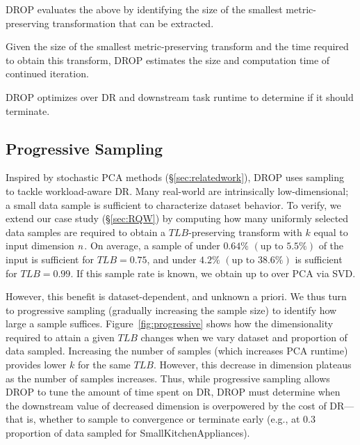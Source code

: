 \noindent DROP evaluates the above by identifying the size of the smallest metric-preserving transformation that can be extracted. 


\noindent Given the size of the smallest metric-preserving transform and the time required to obtain this transform, DROP estimates the size and computation time of continued iteration.


\noindent DROP optimizes over DR and downstream task runtime to determine if it should terminate.

\subsection{Progressive Sampling}
\label{subsec:psample}

Inspired by stochastic PCA methods (\S\ref{sec:relatedwork}), DROP uses sampling to tackle workload-aware DR. 
Many real-world  are intrinsically low-dimensional; a small data sample is sufficient to characterize dataset behavior. 
To verify, we extend our case study (\S\ref{sec:RQW}) by computing how many uniformly selected data samples are required to obtain a $TLB$-preserving transform with $k$ equal to input dimension ${\color{black}n}$.
On average, a sample of under $0.64\%$ $(\text{up to } 5.5\%)$ of the input is sufficient for $TLB = 0.75$, and under $4.2\%$ $(\text{up to } 38.6\%)$ is sufficient for $TLB=0.99$.  
If this sample rate is known, we obtain up to  over PCA via SVD.%

However, this benefit is dataset-dependent, and unknown a priori.
We thus turn to progressive sampling (gradually increasing the sample size) to identify how large a sample suffices.
Figure~\ref{fig:progressive} shows how the dimensionality required to attain a given $TLB$ changes when we vary dataset and proportion of data sampled.
Increasing the number of samples (which increases PCA runtime) provides lower $k$ for the same $TLB$.
However, this decrease in dimension plateaus as the number of samples increases.
Thus, while progressive sampling allows DROP to tune the amount of time spent on DR, DROP must determine when the downstream value of decreased dimension is overpowered by the cost of DR---that is, whether to sample to convergence or terminate early (e.g., at $0.3$ proportion of data sampled for SmallKitchenAppliances). 


